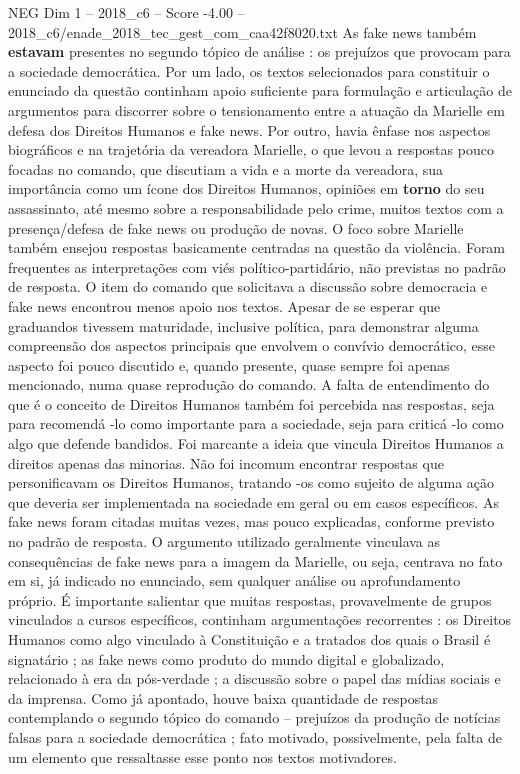 \begin{textsample}{NEG Dim 1 – 2018\_c6 – Score -4.00 – 2018\_c6/enade\_2018\_tec\_gest\_com\_caa42f8020.txt}
As fake news também \textbf{estavam} presentes no segundo tópico de análise : os prejuízos que provocam para a sociedade democrática.
Por um lado, os textos selecionados para constituir o enunciado da questão continham apoio suficiente para formulação e articulação de argumentos para discorrer sobre o tensionamento entre a atuação da Marielle em defesa dos Direitos Humanos e fake news.
Por outro, havia ênfase nos aspectos biográficos e na trajetória da vereadora Marielle, o que levou a respostas pouco focadas no comando, que discutiam a vida e a morte da vereadora, sua importância como um ícone dos Direitos Humanos, opiniões em \textbf{torno} do seu assassinato, até mesmo sobre a responsabilidade pelo crime, muitos textos com a presença/defesa de fake news ou produção de novas.
O foco sobre Marielle também ensejou respostas basicamente centradas na questão da violência.
Foram frequentes as interpretações com viés político-partidário, não previstas no padrão de resposta.
O item do comando que solicitava a discussão sobre democracia e fake news encontrou menos apoio nos textos.
Apesar de se esperar que graduandos tivessem maturidade, inclusive política, para demonstrar alguma compreensão dos aspectos principais que envolvem o convívio democrático, esse aspecto foi pouco discutido e, quando presente, quase sempre foi apenas mencionado, numa quase reprodução do comando.
A falta de entendimento do que é o conceito de Direitos Humanos também foi percebida nas respostas, seja para recomendá -lo como importante para a sociedade, seja para criticá -lo como algo que defende bandidos.
Foi marcante a ideia que vincula Direitos Humanos a direitos apenas das minorias.
Não foi incomum encontrar respostas que personificavam os Direitos Humanos, tratando -os como sujeito de alguma ação que deveria ser implementada na sociedade em geral ou em casos específicos.
As fake news foram citadas muitas vezes, mas pouco explicadas, conforme previsto no padrão de resposta.
O argumento utilizado geralmente vinculava as consequências de fake news para a imagem da Marielle, ou seja, centrava no fato em si, já indicado no enunciado, sem qualquer análise ou aprofundamento próprio.
É importante salientar que muitas respostas, provavelmente de grupos vinculados a cursos específicos, continham argumentações recorrentes : os Direitos Humanos como algo vinculado à Constituição e a tratados dos quais o Brasil é signatário ; as fake news como produto do mundo digital e globalizado, relacionado à era da pós-verdade ; a discussão sobre o papel das mídias sociais e da imprensa.
Como já apontado, houve baixa quantidade de respostas contemplando o segundo tópico do comando – prejuízos da produção de notícias falsas para a sociedade democrática ; fato motivado, possivelmente, pela falta de um elemento que ressaltasse esse ponto nos textos motivadores.

\end{textsample}
